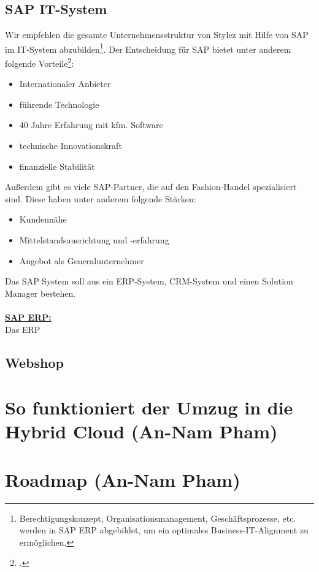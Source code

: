 \subsection{SAP IT-System}
Wir empfehlen die gesamte Unternehmensstruktur von Stylez mit Hilfe von SAP im IT-System abzubilden\footnote{Berechtigungskonzept, Organisationsmanagement, Geschäftsprozesse, etc. werden in SAP ERP abgebildet, um ein optimales Business-IT-Alignment zu ermöglichen.}. Der Entscheidung für SAP bietet unter anderem folgende Vorteile\footcite{SAP_Vorteil}:
\begin{itemize}
\item Internationaler Anbieter
\item führende Technologie
\item 40 Jahre Erfahrung mit kfm. Software
\item technische Innovationskraft
\item finanzielle Stabilität
\end{itemize}
Außerdem gibt es viele SAP-Partner, die auf den Fashion-Handel spezialisiert sind. Diese haben unter anderem folgende Stärken:
\begin{itemize}
\item Kundennähe
\item Mittelstandsausrichtung und -erfahrung
\item Angebot als Generalunternehmer
\end{itemize}
Das SAP System soll aus ein ERP-System, CRM-System und einen Solution Manager bestehen.\\
\\
\underline{\textbf{SAP ERP:}}\\
Das \acrfull{ERP}
\subsection{Webshop}
\section{So funktioniert der Umzug in die Hybrid Cloud (An-Nam Pham)}
\section{Roadmap (An-Nam Pham)}
